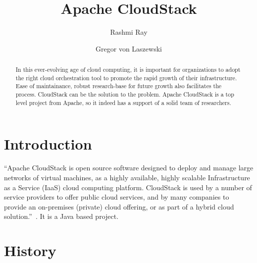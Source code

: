 
\title{Apache CloudStack}


\author{Rashmi Ray}

\author{Gregor von Laszewski}


\renewcommand{\shortauthors}{G. v. Laszewski}


\begin{abstract}

  In this ever-evolving age of cloud computing, it is important for
  organizations to adopt the right cloud orchestration tool to promote
  the rapid growth of their infrastructure. Ease of maintainance, 
  robust research-base for future growth
  also facilitates the process. CloudStack can be the solution to 
  the problem. Apache CloudStack is a top level project from Apache, so it
  indeed has a support of a solid team of researchers.

\end{abstract}


\maketitle

\section{Introduction}

``Apache CloudStack is open source software designed to deploy and
manage large networks of virtual machines, as a highly available,
highly scalable Infrastructure as a Service (IaaS) cloud computing
platform. CloudStack is used by a number of service providers to offer
public cloud services, and by many companies to provide an on-premises
(private) cloud offering, or as part of a hybrid cloud
solution.''~\cite{hid--sp18--417-www--cloudstack--intro}. It is a Java based project.


\section{History}

